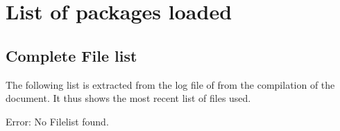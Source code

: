 
\chapter{List of packages loaded}

\section{Complete File list}
\label{sec:appendix:filelist}
The following list is extracted from the log file of  from the compilation of the document. It thus shows the most recent list of files used.

%
	{}
	{Error: No Filelist found.}
